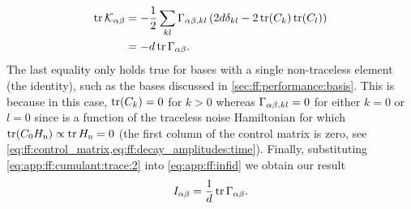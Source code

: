 \begin{equation}\label{eq:app:ff:cumulant:trace:2}
    \begin{split}
        \tr\mathcal{K}_{\alpha\beta} &= -\frac{1}{2}\sum_{kl}\Gamma_{\alpha\beta,kl}\left(2d\delta_{kl} - 2\tr(C_k)\tr(C_l)\right) \\
                                      &= -d\tr\Gamma_{\alpha\beta}.
    \end{split}
\end{equation}
The last equality only holds true for bases with a single non-traceless element (the identity), such as the bases discussed in \cref{sec:ff:performance:basis}.
This is because in this case, $\tr(C_k) = 0$ for $k > 0$ whereas $\Gamma_{\alpha\beta,kl} = 0$ for either $k = 0$ or $l = 0$ since \decayamps is a function of the traceless noise Hamiltonian for which $\tr(C_0H_{\mathrm{n}}) \propto \tr H_{\mathrm{n}} = 0$ (\ie the first column of the control matrix is zero, see \cref{eq:ff:control_matrix,eq:ff:decay_amplitudes:time}).
Finally, substituting \cref{eq:app:ff:cumulant:trace:2} into \cref{eq:app:ff:infid} we obtain our result
\begin{equation}
    I_{\alpha\beta} = \frac{1}{d}\tr\Gamma_{\alpha\beta}.
\end{equation}

